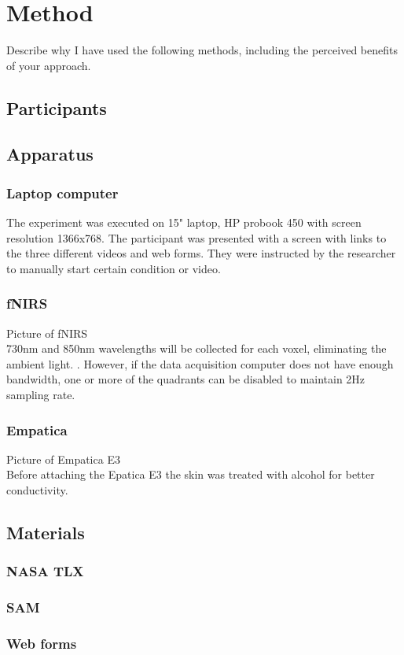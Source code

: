 \documentclass[a4paper]{report}
\begin{document}
	\section{Method}
	Describe why I have used the following methods, including the perceived benefits of your approach\cite{preferences-study}.
		\subsection{Participants}
		\subsection{Apparatus}
			\subsubsection{Laptop computer}
			The experiment was executed on 15" laptop, HP probook 450 with screen resolution 1366x768. The participant was presented with a screen with links to the three different videos and web forms. They were instructed by the researcher to manually start certain condition or video. 
			\subsubsection{fNIRS}
			Picture of fNIRS\\
			730nm and 850nm wavelengths will be collected for each voxel, eliminating the ambient light. . However, if the data acquisition computer does not have enough bandwidth,
			one or more of the quadrants can be disabled to maintain 2Hz sampling rate. 
			\subsubsection{Empatica}
			Picture of Empatica E3\\
			Before attaching the Epatica E3 the skin was treated with alcohol for better conductivity.
        \subsection{Materials}
			\subsubsection{NASA TLX}
			\subsubsection{SAM}
			\subsubsection{Web forms}
\end{document}
